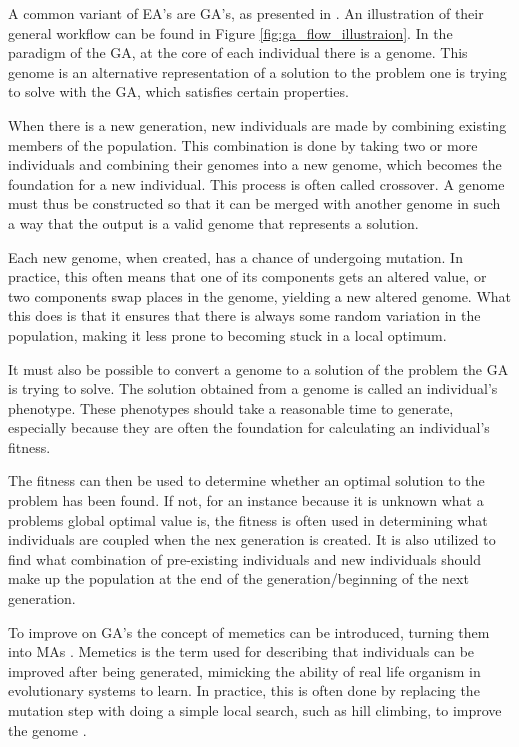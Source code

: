 A common variant of EA's are GA's, as presented in \citet{holland1975originalGA}. An illustration of their general workflow can be found in Figure \ref{fig:ga_flow_illustraion}. In the paradigm of the GA, at the core of each individual there is a genome. This genome is an alternative representation of a solution to the problem one is trying to solve with the GA, which satisfies certain properties.

When there is a new generation, new individuals are made by combining existing members of the population. This combination is done by taking two or more individuals and combining their genomes into a new genome, which becomes the foundation for a new individual. This process is often called crossover. A genome must thus be constructed so that it can be merged with another genome in such a way that the output is a valid genome that represents a solution.

Each new genome, when created, has a chance of undergoing mutation. In practice, this often means that one of its components gets an altered value, or two components swap places in the genome, yielding a new altered genome. What this does is that it ensures that there is always some random variation in the population, making it less prone to becoming stuck in a local optimum.

It must also be possible to convert a genome to a solution of the problem the GA is trying to solve. The solution obtained from a genome is called an individual's phenotype. These phenotypes should take a reasonable time to generate, especially because they are often the foundation for calculating an individual's fitness.

The fitness can then be used to determine whether an optimal solution to the problem has been found. If not, for an instance because it is unknown what a problems global optimal value is, the fitness is often used in determining what individuals are coupled when the nex generation is created. It is also utilized to find what combination of pre-existing individuals and new individuals should make up the population at the end of the generation/beginning of the next generation.

To improve on GA's the concept of memetics can be introduced, turning them into MAs \citep{moscato1989memeticism}. Memetics is the term used for describing that individuals can be improved after being generated, mimicking the ability of real life organism in evolutionary systems to learn. In practice, this is often done by replacing the mutation step with doing a simple local search, such as hill climbing, to improve the genome \citep{lacomme2004competitiveMA}.

